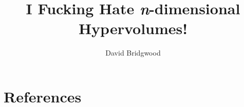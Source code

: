 \documentclass[a4paper,12pt,oneside]{article}
\begin{document}
\title{I Fucking Hate \emph{n}-dimensional Hypervolumes!}

\author{David Bridgwood}

\maketitle

\preface




\body
\normalsize

\clearpage






\clearpage
\section{References}
{\def\section*#1{}
	
	
}


\clearpage

\end{document}
